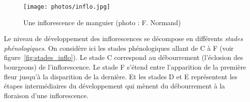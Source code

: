 \begin{figure}[ht]
 \centering
 \texttt{[image: photos/inflo.jpg]}
 \caption{Une inflorescence de manguier (photo : F. Normand)}
 \label{fig:inflo}
\end{figure}




Le niveau de développement des inflorescences se décompose en différents \emph{stades phénologiques}.
On considère ici les stades phénologiques allant de C à F (voir figure~\ref{fig:stades_inflo}).
Le stade C correspond au débourrement (l'éclosion des bourgeons) de l'inflorescence.
Le stade F s'étend entre l'apparition de la première fleur jusqu'à la disparition de la dernière.
Et les stades D et E représentent les étapes intermédiaires du développement qui mènent du débourrement à la floraison d'une inflorescence.

